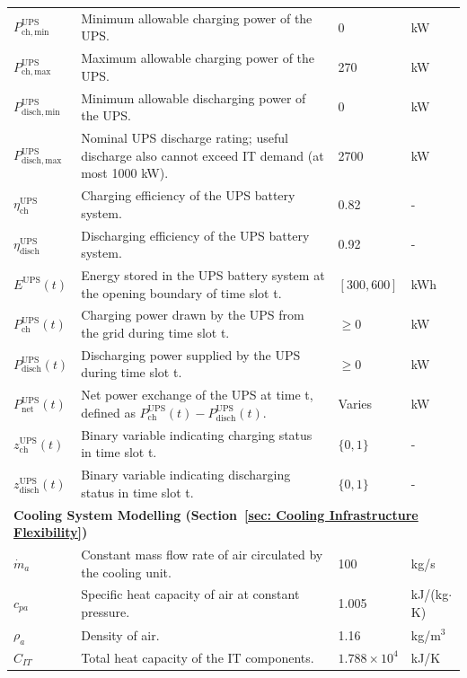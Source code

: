 \documentclass[lettersize,journal]{IEEEtran}
\providecommand{\DIFadd}[1]{{\color{blue}#1}}
\providecommand{\DIFaddFL}[1]{\DIFadd{#1}}
\begin{document}
{{\begin{longtable}{p{} p{} p{} p{}}
$P^{\mathrm{UPS}}_{\mathrm{ch,min}}$ & Minimum allowable charging power of the UPS. & \DIFaddFL{0} &kW \\
$P^{\mathrm{UPS}}_{\mathrm{ch,max}}$ & Maximum allowable charging power of the UPS. & 270 &kW \\
$P^{\mathrm{UPS}}_{\mathrm{disch,min}}$ & Minimum allowable discharging power of the UPS. & \DIFaddFL{0} &kW \\
$P^{\mathrm{UPS}}_{\mathrm{disch,max}}$ & \DIFaddFL{Nominal UPS discharge rating; useful discharge also cannot exceed IT demand (at most 1000 kW).} & 2700 &kW \\
$\eta^{\mathrm{UPS}}_{\mathrm{ch}}$ & Charging efficiency of the UPS battery system. & 0.82 & - \\
$\eta^{\mathrm{UPS}}_{\mathrm{disch}}$ & Discharging efficiency of the UPS battery system. & 0.92 & - \\
$E^{\mathrm{UPS}}(t)$ & \DIFaddFL{Energy stored in the UPS battery system at the opening boundary of time slot t.} & $[300, 600]$ &kWh \\
$P^{\mathrm{UPS}}_{\mathrm{ch}}(t)$ & Charging power drawn by the UPS from the grid during time slot t. & $\geq 0$ &kW \\
$P^{\mathrm{UPS}}_{\mathrm{disch}}(t)$ & Discharging power supplied by the UPS during time slot t. & $\geq 0$ &kW \\
$P^{\mathrm{UPS}}_{\mathrm{net}}(t)$ & Net power exchange of the UPS at time t, defined as $P^{\mathrm{UPS}}_{\mathrm{ch}}(t) - P^{\mathrm{UPS}}_{\mathrm{disch}}(t)$. & Varies &kW \\
$z^{\mathrm{UPS}}_{\mathrm{ch}}(t)$ & Binary variable indicating charging status in time slot t. & $\{0, 1\}$ & - \\
$z^{\mathrm{UPS}}_{\mathrm{disch}}(t)$ & Binary variable indicating discharging status in time slot t. & $\{0, 1\}$ & - \\
\midrule
\multicolumn{4}{l}{\textbf{Cooling System Modelling (Section~\ref{sec: Cooling Infrastructure Flexibility})}} \\
\midrule
$\dot{m}_a$ & Constant mass flow rate of air circulated by the cooling unit. & 100 & kg/s \\
$c_{pa}$ & Specific heat capacity of air at constant pressure. & 1.005 & kJ/(kg$\cdot$K) \\
$\rho_a$ & Density of air. & 1.16 & kg/m$^3$ \\
$C_{IT}$ & Total heat capacity of the IT components. & $1.788 \times 10^4$ & kJ/K \\

\end{longtable}}}
\end{document}
